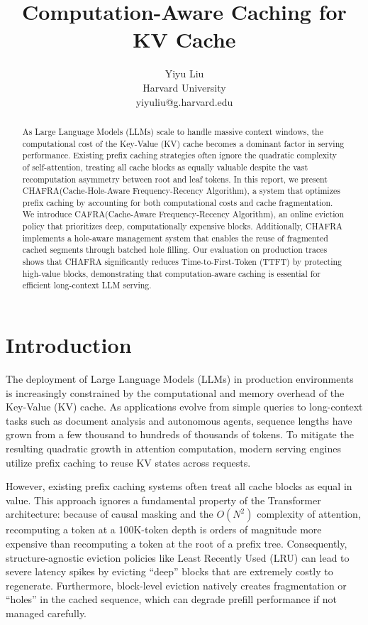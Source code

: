 \documentclass[letterpaper,twocolumn,10pt]{article}
\newcommand{\sys}{CHAFRA\xspace}
\newcommand{\sysfull}{Cache-Hole-Aware Frequency-Recency Algorithm\xspace}
\newcommand{\algo}{CAFRA\xspace}
\newcommand{\algofull}{Cache-Aware Frequency-Recency Algorithm\xspace}
\begin{document}
\title{Computation-Aware Caching for KV Cache}
\author{
{\rm Yiyu Liu}\\
Harvard University\\
yiyuliu@g.harvard.edu
}

\maketitle
\pagestyle{plain}

\begin{abstract}
As Large Language Models (LLMs) scale to handle massive context windows, the 
computational cost of the Key-Value (KV) cache becomes a dominant factor in 
serving performance. Existing prefix caching strategies often ignore the 
quadratic complexity of self-attention, treating all cache blocks as equally 
valuable despite the vast recomputation asymmetry between root and leaf tokens. 
In this report, we present \sys (\sysfull), a system that optimizes prefix 
caching by accounting for both computational costs and cache fragmentation. 
We introduce \algo (\algofull), an online eviction policy that prioritizes 
deep, computationally expensive blocks. Additionally, \sys implements a 
hole-aware management system that enables the reuse of fragmented cached 
segments through batched hole filling. Our evaluation on production traces 
shows that \sys significantly reduces Time-to-First-Token (TTFT) by protecting 
high-value blocks, demonstrating that computation-aware caching is essential 
for efficient long-context LLM serving.
\end{abstract}

\section{Introduction}
The deployment of Large Language Models (LLMs) in production environments is increasingly constrained by the computational and memory overhead of the Key-Value (KV) cache. As applications evolve from simple queries to long-context tasks such as document analysis and autonomous agents, sequence lengths have grown from a few thousand to hundreds of thousands of tokens. To mitigate the resulting quadratic growth in attention computation, modern serving engines utilize prefix caching to reuse KV states across requests.

However, existing prefix caching systems often treat all cache blocks as equal in value. This approach ignores a fundamental property of the Transformer architecture: because of causal masking and the $O(N^2)$ complexity of attention, recomputing a token at a 100K-token depth is orders of magnitude more expensive than recomputing a token at the root of a prefix tree. Consequently, structure-agnostic eviction policies like Least Recently Used (LRU) can lead to severe latency spikes by evicting ``deep'' blocks that are extremely costly to regenerate. Furthermore, block-level eviction natively creates fragmentation or ``holes'' in the cached sequence, which can degrade prefill performance if not managed carefully.
\end{document}
